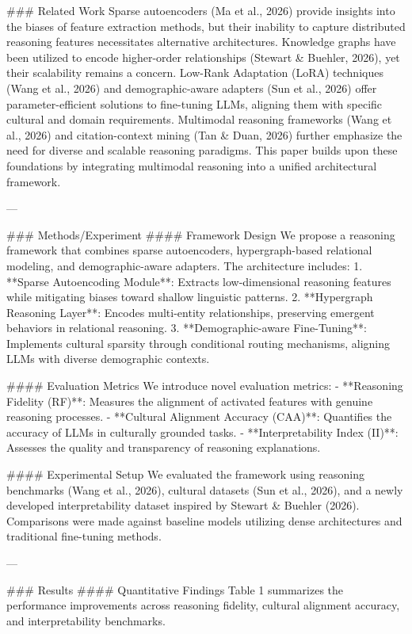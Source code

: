 ### Related Work  
Sparse autoencoders (Ma et al., 2026) provide insights into the biases of feature extraction methods, but their inability to capture distributed reasoning features necessitates alternative architectures. Knowledge graphs have been utilized to encode higher-order relationships (Stewart & Buehler, 2026), yet their scalability remains a concern. Low-Rank Adaptation (LoRA) techniques (Wang et al., 2026) and demographic-aware adapters (Sun et al., 2026) offer parameter-efficient solutions to fine-tuning LLMs, aligning them with specific cultural and domain requirements. Multimodal reasoning frameworks (Wang et al., 2026) and citation-context mining (Tan & Duan, 2026) further emphasize the need for diverse and scalable reasoning paradigms. This paper builds upon these foundations by integrating multimodal reasoning into a unified architectural framework.  

---

### Methods/Experiment  
#### Framework Design  
We propose a reasoning framework that combines sparse autoencoders, hypergraph-based relational modeling, and demographic-aware adapters. The architecture includes:  
1. **Sparse Autoencoding Module**: Extracts low-dimensional reasoning features while mitigating biases toward shallow linguistic patterns.  
2. **Hypergraph Reasoning Layer**: Encodes multi-entity relationships, preserving emergent behaviors in relational reasoning.  
3. **Demographic-aware Fine-Tuning**: Implements cultural sparsity through conditional routing mechanisms, aligning LLMs with diverse demographic contexts.  

#### Evaluation Metrics  
We introduce novel evaluation metrics:  
- **Reasoning Fidelity (RF)**: Measures the alignment of activated features with genuine reasoning processes.  
- **Cultural Alignment Accuracy (CAA)**: Quantifies the accuracy of LLMs in culturally grounded tasks.  
- **Interpretability Index (II)**: Assesses the quality and transparency of reasoning explanations.  

#### Experimental Setup  
We evaluated the framework using reasoning benchmarks (Wang et al., 2026), cultural datasets (Sun et al., 2026), and a newly developed interpretability dataset inspired by Stewart & Buehler (2026). Comparisons were made against baseline models utilizing dense architectures and traditional fine-tuning methods.  

---

### Results  
#### Quantitative Findings  
Table 1 summarizes the performance improvements across reasoning fidelity, cultural alignment accuracy, and interpretability benchmarks.  

